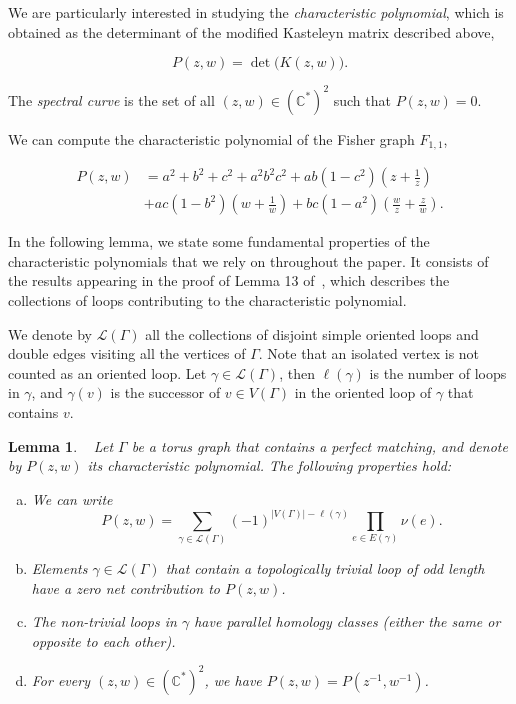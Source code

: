 \documentclass[12pt,a4paper]{article}
\newtheorem{lem}[thm]{Lemma}
\theoremstyle{definition}
\def\\deg{\mathrm {\deg}}
\begin{document}
We are particularly interested in studying the \emph{characteristic polynomial}, which is obtained as the determinant of the modified Kasteleyn matrix described above,

\[P(z,w) = \det\big(K(z,w)\big).\]

The \emph{spectral curve} is the set of all $(z,w)\in(\mathbb C^*)^2$ such that $P(z,w) = 0$.

We can compute the characteristic polynomial of the Fisher graph $F_{1,1}$,

\begin{equation}\label{char for F_11}
\begin{aligned}
P(z,w) &= a^2 + b^2 + c^2 + a^2 b^2 c^2 + a b (1 - c^2) \left(z + \frac{1}{z}\right) \\
       &+ a c (1 - b^2) \left(w + \frac{1}{w} \right)
       + b c (1 - a^2) \left(\frac{w}{z} + \frac{z}{w} \right).
\end{aligned}
\end{equation}

In the following lemma, we state some fundamental properties of the characteristic polynomials that we rely on throughout the paper. It consists of the results appearing in the proof of Lemma 13 of~\cite{BoutillierdeTiliere2010}, which describes the collections of loops contributing to the characteristic polynomial. 

We denote by $\mathcal{L}(\Gamma)$ all the collections of disjoint simple oriented loops and double edges visiting all the vertices of $\Gamma$. Note that an isolated vertex is not counted as an oriented loop. Let $\gamma \in \mathcal{L}(\Gamma)$, then $\ell(\gamma)$ is the number of loops in $\gamma$, and $\gamma(v)$ is the successor of $v \in V(\Gamma)$ in the oriented loop of $\gamma$ that contains $v$.

\begin{lem} \label{char_poly_properties}~\cite{BoutillierdeTiliere2010}
    Let $\Gamma$ be a torus graph that contains a perfect matching, and denote by $P(z, w)$ its characteristic polynomial. The following properties hold:
    \begin{enumerate}[(a)]
        \item  We can write
        \[P(z,w) = \sum_{\gamma \in \mathcal{L}(\Gamma)} (-1)^{|V(\Gamma)|-\ell(\gamma)} \prod_{e \in E(\gamma)} \nu(e).\]
        
        \item Elements $\gamma\in\mathcal L(\Gamma)$ that contain a topologically trivial loop of odd length have a zero net contribution to $P(z,w)$. 
        
        \item The non-trivial loops in $\gamma$ have parallel homology classes (either the same or opposite to each other). 
        
        \item For every $(z, w) \in (\mathbb{C^*})^2$, we have $P(z,w) = P(z^{-1}, w^{-1})$.
    \end{enumerate}
\end{lem}
\end{document}
